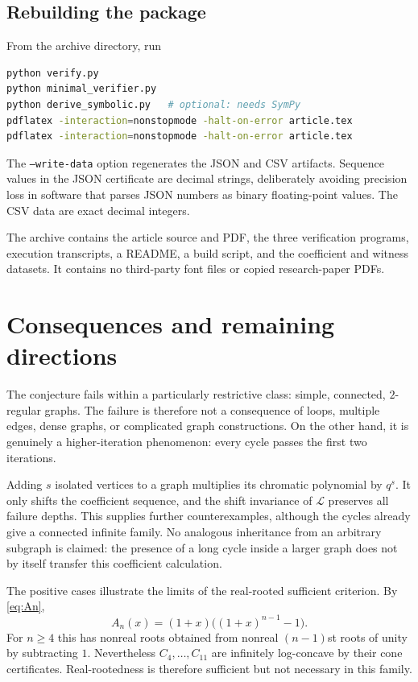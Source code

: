 \documentclass[11pt,a4paper]{article}
\theoremstyle{definition}
\newcommand{\Lop}{\mathcal L}
\begin{document}
\subsection{Rebuilding the package}
From the archive directory, run
\begin{lstlisting}[language=bash]
python verify.py
python minimal_verifier.py
python derive_symbolic.py   # optional: needs SymPy
pdflatex -interaction=nonstopmode -halt-on-error article.tex
pdflatex -interaction=nonstopmode -halt-on-error article.tex
\end{lstlisting}
The \texttt{--write-data} option regenerates the JSON and CSV artifacts.
Sequence values in the JSON certificate are decimal strings, deliberately
avoiding precision loss in software that parses JSON numbers as binary
floating-point values. The CSV data are exact decimal integers.

The archive contains the article source and PDF, the three verification
programs, execution transcripts, a README, a build script, and the
coefficient and witness datasets. It contains no third-party font files
or copied research-paper PDFs.

\section{Consequences and remaining directions}\label{sec:consequences}

The conjecture fails within a particularly restrictive class: simple,
connected, $2$-regular graphs. The failure is therefore not a consequence
of loops, multiple edges, dense graphs, or complicated graph
constructions. On the other hand, it is genuinely a higher-iteration
phenomenon: every cycle passes the first two iterations.

Adding $s$ isolated vertices to a graph multiplies its chromatic
polynomial by $q^s$. It only shifts the coefficient sequence, and the
shift invariance of $\Lop$ preserves all failure depths. This supplies
further counterexamples, although the cycles already give a connected
infinite family. No analogous inheritance from an arbitrary subgraph is
claimed: the presence of a long cycle inside a larger graph does not by
itself transfer this coefficient calculation.

The positive cases illustrate the limits of the real-rooted sufficient
criterion. By \eqref{eq:An},
\[
 A_n(x)=(1+x)\bigl((1+x)^{n-1}-1\bigr).
\]
For $n\ge4$ this has nonreal roots obtained from nonreal $(n-1)$st roots
of unity by subtracting $1$. Nevertheless $C_4,\ldots,C_{11}$ are
infinitely log-concave by their cone certificates. Real-rootedness is
therefore sufficient but not necessary in this family.
\end{document}
